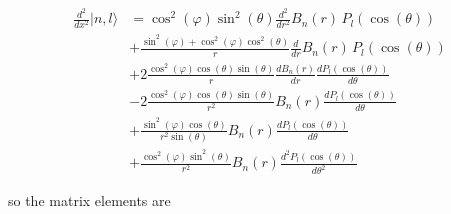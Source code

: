 \documentclass[12pt,a4paper]{article}
\newcommand{\ddx}[1]{\frac{d^2{#1}}{dx^2}}
\newcommand{\dr}[1]{\frac{d{#1}}{dr}}
\newcommand{\ddr}[1]{\frac{d^2{#1}}{dr^2}}
\newcommand{\dt}[1]{\frac{d{#1}}{d\theta}}
\newcommand{\ddt}[1]{\frac{d^2{#1}}{d\theta^2}}
\newcommand{\ccphi}{\cos^2(\varphi)}
\newcommand{\ssphi}{\sin^2(\varphi)}
\newcommand{\ct}{\cos(\theta)}
\newcommand{\cct}{\cos^2(\theta)}
\newcommand{\st}{\sin(\theta)}
\newcommand{\sst}{\sin^2(\theta)}
\begin{document}
\begin{equation}
\begin{split}
\ddx{}|n,l\rangle &= \ccphi \sst \ddr{} B_n(r)\, P_l(\ct) \\
                &+ \frac{\ssphi+\ccphi\cct}{r}\dr{} B_n(r)\,P_l(\ct) \\
                &+2\frac{\ccphi\ct\st}{r}\dr{B_n(r)} \dt{P_l(\ct)} \\
                &-2\frac{\ccphi\ct\st}{r^2} B_n(r) \dt{P_l(\ct)} \\
                &+ \frac{\ssphi\ct}{r^2\st} B_n(r)\dt{P_l(\ct)} \\
                &+ \frac{\ccphi\sst}{r^2}B_n(r)\ddt{P_l(\ct)}
\end{split}
\end{equation}

\noindent so the matrix elements are
\end{document}
